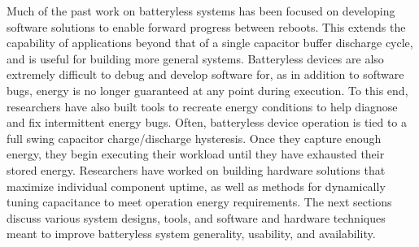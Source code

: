 Much of the past work on batteryless systems has been focused on developing software solutions to enable forward progress between reboots. This extends the capability of applications beyond that of a single capacitor buffer discharge cycle, and is useful for building more general systems.
Batteryless devices are also extremely difficult to debug and develop software for, as in addition to software bugs, energy is no longer guaranteed at any point during execution. 
To this end, researchers have also built tools to recreate energy conditions to help diagnose and fix intermittent energy bugs.
Often, batteryless device operation is tied to a full swing capacitor charge/discharge hysteresis. Once they capture enough energy, they begin executing their workload until they have exhausted their stored energy. Researchers have worked on building hardware solutions that maximize individual component uptime, as well as methods for dynamically tuning capacitance to meet operation energy requirements.
The next sections discuss various system designs, tools, and software and hardware techniques meant to improve batteryless system generality, usability, and availability. 


